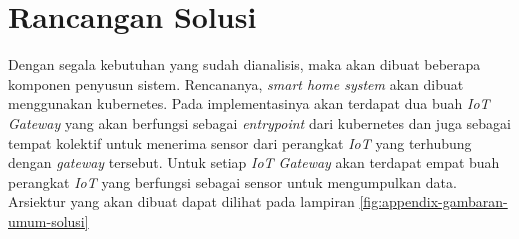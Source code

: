\section{Rancangan Solusi}
\label{sec:rancangan-solusi}

Dengan segala kebutuhan yang sudah dianalisis, maka akan dibuat beberapa komponen penyusun sistem. Rencananya, \textit{smart home system} akan dibuat menggunakan kubernetes. Pada implementasinya akan terdapat dua buah \textit{IoT Gateway} yang akan berfungsi sebagai \textit{entrypoint} dari kubernetes dan juga sebagai tempat kolektif untuk menerima sensor dari perangkat \textit{IoT} yang terhubung dengan \textit{gateway} tersebut. Untuk setiap \textit{IoT Gateway} akan terdapat empat buah perangkat \textit{IoT} yang berfungsi sebagai sensor untuk mengumpulkan data. Arsiektur yang akan dibuat dapat dilihat pada lampiran \ref{fig:appendix-gambaran-umum-solusi}